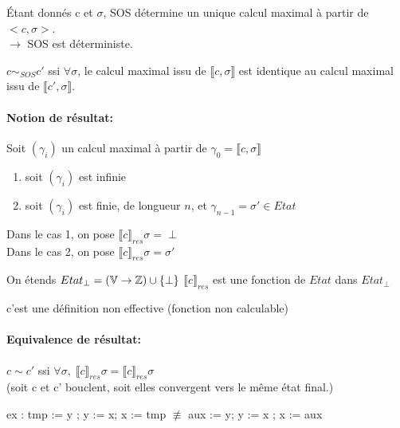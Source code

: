 \documentclass[10pt,a4paper]{article}
\newcommand{\sem}[1]{$\llbracket #1 \rrbracket$}
\newcommand{\semm}[1]{\llbracket #1 \rrbracket }
\newcommand{\Vs}{\mathbb{V}}
\begin{document}
\begin{thm}Étant donnés c et $\sigma$, SOS détermine un unique calcul maximal à partir de $<c, \sigma >$.\\
 $\rightarrow$ SOS est déterministe.\\
 \end{thm}
 
 \begin{definition}[Equivalence]
 $ c \sim_{SOS} c'$ ssi $\forall \sigma$, le calcul maximal issu de \sem{c , \sigma} est  identique au calcul maximal issu de \sem{c', \sigma}.
 \end{definition}
 


\paragraph*{Notion de résultat:}
\begin{thm} Soit $(\gamma_i)$ un calcul maximal à partir de $\gamma_0 = \semm{c, \sigma }$
\begin{enumerate}
\item soit $(\gamma_i)$ est infinie
\item soit $(\gamma_i )$ est finie, de longueur $n$, et $\gamma_{n-1} = \sigma' \in Etat$
\end{enumerate}
Dans le cas 1, on pose $\semm{ c }_{res} \sigma = \perp$\\
Dans le cas 2, on pose $\semm{ c }_{res} \sigma  = \sigma'$\\
\end{thm}


On étends $Etat_{\perp} = (\Vs \rightarrow \Zs) \cup \{ \perp \}$
$\semm{ c }_{res}$ est une fonction de $Etat$ dans $Etat_{\perp}$
\begin{rem} c'est une définition non effective (fonction non calculable)
\end{rem}


\paragraph{Equivalence de résultat:}
\begin{definition} $c \sim c'$ ssi $\forall \sigma, \; \semm{ c }_{res} \sigma = \semm{ c }_{res} \sigma$\\
(soit c et c' bouclent, soit elles convergent vers le même état final.)
\end{definition}

ex : tmp := y ; y := x; x := tmp $\not \equiv$ aux := y; y := x ; x := aux
\end{document}

